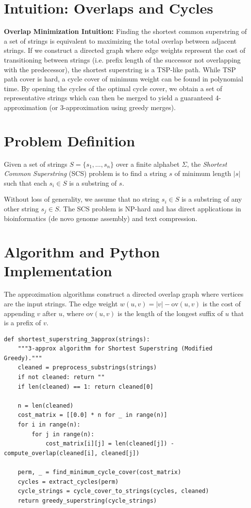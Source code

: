 \documentclass[11pt,oneside]{book}
\begin{document}
\section{Intuition: Overlaps and Cycles}

\begin{intuitionbox}
\textbf{Overlap Minimization Intuition:} Finding the shortest common superstring of a set of strings is equivalent to maximizing the total overlap between adjacent strings. If we construct a directed graph where edge weights represent the cost of transitioning between strings (i.e. prefix length of the successor not overlapping with the predecessor), the shortest superstring is a TSP-like path. While TSP path cover is hard, a cycle cover of minimum weight can be found in polynomial time. By opening the cycles of the optimal cycle cover, we obtain a set of representative strings which can then be merged to yield a guaranteed 4-approximation (or 3-approximation using greedy merges).
\end{intuitionbox}

\section{Problem Definition}
Given a set of strings $S = \{s_1, \dots, s_n\}$ over a finite alphabet $\Sigma$, the \emph{Shortest Common Superstring} (SCS) problem is to find a string $s$ of minimum length $|s|$ such that each $s_i \in S$ is a substring of $s$.

Without loss of generality, we assume that no string $s_i \in S$ is a substring of any other string $s_j \in S$. The SCS problem is NP-hard and has direct applications in bioinformatics (de novo genome assembly) and text compression.

\section{Algorithm and Python Implementation}
The approximation algorithms construct a directed overlap graph where vertices are the input strings. The edge weight $w(u, v) = |v| - \text{ov}(u, v)$ is the cost of appending $v$ after $u$, where $\text{ov}(u, v)$ is the length of the longest suffix of $u$ that is a prefix of $v$. 

\begin{lstlisting}[style=python, caption=Approximation Algorithms for Shortest Superstring]
def shortest_superstring_3approx(strings):
    """3-approx algorithm for Shortest Superstring (Modified Greedy)."""
    cleaned = preprocess_substrings(strings)
    if not cleaned: return ""
    if len(cleaned) == 1: return cleaned[0]
        
    n = len(cleaned)
    cost_matrix = [[0.0] * n for _ in range(n)]
    for i in range(n):
        for j in range(n):
            cost_matrix[i][j] = len(cleaned[j]) - compute_overlap(cleaned[i], cleaned[j])
            
    perm, _ = find_minimum_cycle_cover(cost_matrix)
    cycles = extract_cycles(perm)
    cycle_strings = cycle_cover_to_strings(cycles, cleaned)
    return greedy_superstring(cycle_strings)
\end{lstlisting}
\end{document}
